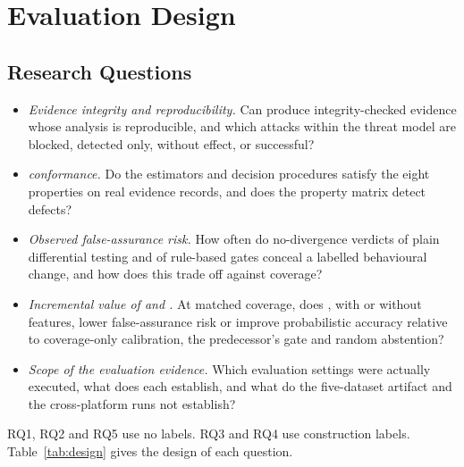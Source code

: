 \section{Evaluation Design}\label{sec:design}

\subsection{Research Questions}
\begin{itemize}
\item[RQ1)] \emph{Evidence integrity and reproducibility.} Can \sbg{} produce integrity-checked evidence whose analysis is reproducible, and which attacks within the threat model are blocked, detected only, without effect, or successful?
\item[RQ2)] \emph{\ers{} conformance.} Do the \sbg{} estimators and decision procedures satisfy the eight \ers{} properties on real evidence records, and does the property matrix detect defects?
\item[RQ3)] \emph{Observed false-assurance risk.} How often do no-divergence verdicts of plain differential testing and of rule-based gates conceal a labelled behavioural change, and how does this trade off against coverage?
\item[RQ4)] \emph{Incremental value of \cec{} and \ers{}.} At matched coverage, does \cec{}, with or without \ers{} features, lower false-assurance risk or improve probabilistic accuracy relative to coverage-only calibration, the predecessor's gate and random abstention?
\item[RQ5)] \emph{Scope of the evaluation evidence.} Which evaluation settings were actually executed, what does each establish, and what do the five-dataset artifact and the cross-platform runs not establish?
\end{itemize}
RQ1, RQ2 and RQ5 use no labels. RQ3 and RQ4 use construction labels. Table~\ref{tab:design} gives the design of each question.

